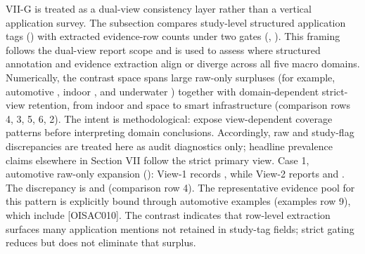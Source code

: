 \markdownRendererInterblockSeparator
{}VII-G is treated as a dual-view consistency layer rather than a vertical application survey. The subsection compares study-level structured application tags () with extracted evidence-row counts under two gates (, ). This framing follows the dual-view report scope and is used to assess where structured annotation and evidence extraction align or diverge across all five macro domains. Numerically, the contrast space spans large raw-only surpluses (for example, automotive , indoor , and underwater ) together with domain-dependent strict-view retention, from indoor  and space  to smart infrastructure  (comparison rows \markdownRendererHash{}4, \markdownRendererHash{}3, \markdownRendererHash{}5, \markdownRendererHash{}6, \markdownRendererHash{}2). The intent is methodological: expose view-dependent coverage patterns before interpreting domain conclusions. Accordingly, raw and study-flag discrepancies are treated here as audit diagnostics only; headline prevalence claims elsewhere in Section VII follow the strict primary view.\markdownRendererInterblockSeparator
{}
\markdownRendererSectionEnd \markdownRendererSectionBegin
{}\markdownRendererInterblockSeparator
{}Case 1, automotive raw-only expansion (): View-1 records , while View-2 reports  and . The discrepancy is  and  (comparison row \markdownRendererHash{}4). The representative evidence pool for this pattern is explicitly bound through automotive  examples (examples row \markdownRendererHash{}9), which include  [O\markdownRendererUnderscore{}ISAC\markdownRendererUnderscore{}010]. The contrast indicates that row-level extraction surfaces many application mentions not retained in study-tag fields; strict gating reduces but does not eliminate that surplus.\markdownRendererParagraphSeparator
